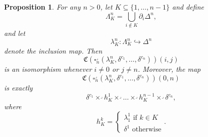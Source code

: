 \documentclass{amsart}
\numberwithin{equation}{section}
\theoremstyle{plain}   %
\newtheorem{prop}[subsection]{Proposition}
\theoremstyle{remark}
\theoremstyle{plain}
\begin{document}
\begin{prop}
	For any \(n>0\), let \(K\subseteq \{1,\dots,n-1\}\) and define
	\[\Lambda^n_K=\bigcup_{i\notin K} \partial_i \Delta^n,\]
	and let
	\[\lambda^n_K:\Lambda^n_K\hookrightarrow \Delta^n\]
	denote the inclusion map.  Then
	\[\mathfrak{C}(\square^\lrcorner_n(\lambda^n_K,\delta^{c_1},\dots,\delta^{c_n}))(i,j)\]
	is an isomorphism whenever \(i\neq 0\) or \(j\neq n\).  Moreover, the map
	\[\mathfrak{C}(\square^\lrcorner_n(\lambda^n_K,\delta^{c_1},\dots,\delta^{c_n}))(0,n)\]
	is exactly
	\[\delta^{c_1}\times^\lrcorner h^1_K \times^\lrcorner \dots \times^\lrcorner h^{n-1}_K \times^\lrcorner \delta^{c_n},\]
	where
	\[
		h^k_K =
		\begin{cases}
			\lambda^1_1 \text{ if } k\in K \\
			\delta^1 \text{ otherwise}
		\end{cases}.
	\]
\end{prop}
\end{document}
